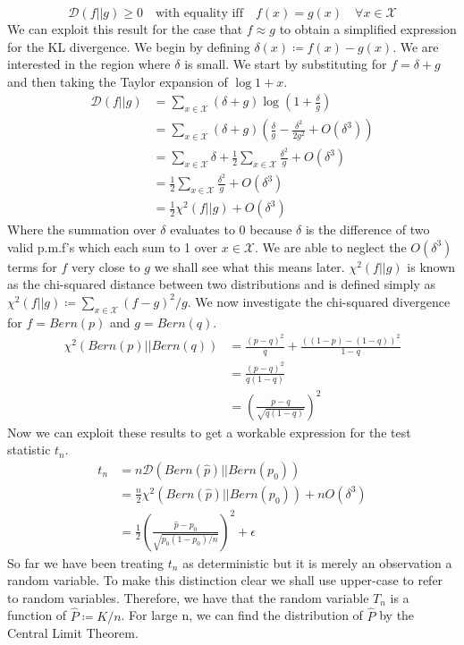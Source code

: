 \documentclass[]{article}
\newcommand{\Xcal}{\mathcal{X}}
\newcommand{\kl}{\mathcal{D}}
\begin{document}
%
\begin{equation}
\kl (f || g) \geq 0 \quad \text{with equality iff} \quad f(x) = g(x) \quad \forall x \in \Xcal
\end{equation}
%
We can exploit this result for the case that $f \approx g$ to obtain a simplified expression for the KL divergence. We begin by defining $\delta (x) \coloneqq f(x) - g(x)$. We are interested in the region where $\delta$ is small. We start by substituting for $f=\delta + g$ and then taking the Taylor expansion of $\log 1+x$.
%
\begin{align*}
\kl(f||g) &= \sum_{x \in \Xcal} (\delta + g) \log \left(1 + \frac{\delta}{g} \right) \\
&= \sum_{x \in \Xcal} (\delta + g) \left( \frac{\delta}{g} - \frac{\delta^2}{2g^2} + O(\delta^3) \right) \\
&= \sum_{x \in \Xcal} \delta + \frac{1}{2} \sum_{x \in \Xcal} \frac{\delta^2}{g} + O(\delta^3) \\
&= \frac{1}{2} \sum_{x \in \Xcal} \frac{\delta^2}{g} + O(\delta^3) \\
&= \frac{1}{2} \chi^2(f||g) + O(\delta^3)
\end{align*}
%
Where the summation over $\delta$ evaluates to 0 because $\delta$ is the difference of two valid p.m.f's which each sum to 1 over $x \in \Xcal$. We are able to neglect the $O(\delta^3)$ terms for $f$ very close to $g$ we shall see what this means later. $\chi^2(f||g)$ is known as the chi-squared distance between two distributions and is defined simply as $\chi^2(f||g) \coloneqq \sum_{x \in \Xcal} (f-g)^2/g$. We now investigate the chi-squared divergence for $f = Bern(p)$ and $g = Bern(q)$.
%
\begin{align*}
\chi^2(Bern(p)||Bern(q)) &= \frac{(p-q)^2}{q} + \frac{((1-p)-(1-q))^2}{1-q} \\
&= \frac{(p-q)^2}{q(1-q)} \\
&= \left(\frac{p-q}{\sqrt{q(1-q)}}\right)^2
\end{align*}
%
Now we can exploit these results to get a workable expression for the test statistic $t_n$.
%
\begin{align*}
t_n &= n \kl \left(Bern(\hat{p}) || Bern(p_0)\right) \\
	&= \frac{n}{2} \chi^2 \left(Bern(\hat{p}) || Bern(p_0) \right) + nO(\delta^3) \\
	&= \frac{1}{2} \left( \frac{\hat{p} - p_0}{\sqrt{p_0(1-p_0)/n}} \right)^2 + \epsilon
\end{align*}
%
So far we have been treating $t_n$ as deterministic but it is merely an observation a random variable. To make this distinction clear we shall use upper-case to refer to random variables. Therefore, we have that the random variable $T_n$ is a function of $\hat{P} \coloneqq K/n$. For large n, we can find the distribution of $\hat{P}$ by the Central Limit Theorem.
\end{document}
